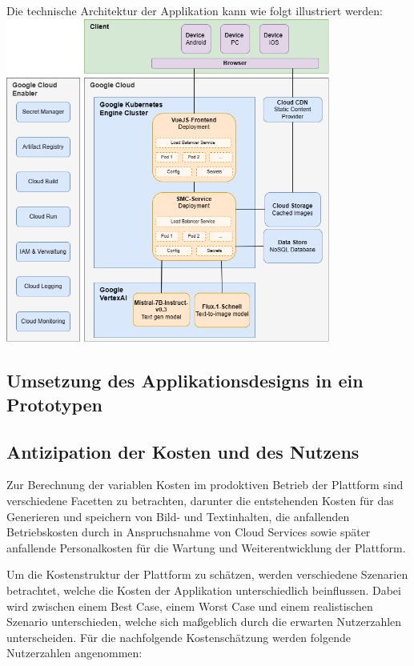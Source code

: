 Die technische Architektur der Applikation kann wie folgt illustriert werden:
\includegraphics[width=0.8\textwidth]{abbildungen/Drawio/SystemArchitektur}

\subsection{Umsetzung des Applikationsdesigns in ein Prototypen}\label{subsec:umsetzung-des-applikationsdesigns-in-ein-prototypen}

\subsection{Antizipation der Kosten und des Nutzens}

Zur Berechnung der variablen Kosten im prodoktiven Betrieb der Plattform sind verschiedene Facetten zu betrachten, darunter die entstehenden Kosten für das Generieren und
speichern von Bild- und Textinhalten, die anfallenden Betriebskosten durch in Anspruchsnahme von Cloud Services sowie später anfallende Personalkosten für die Wartung und Weiterentwicklung der Plattform.

Um die Kostenstruktur der Plattform zu schätzen, werden verschiedene Szenarien betrachtet, welche die Kosten der Applikation unterschiedlich beinflussen.
Dabei wird zwischen einem Best Case, einem Worst Case und einem realistischen Szenario unterschieden, welche sich maßgeblich durch die erwarten Nutzerzahlen unterscheiden.
Für die nachfolgende Kostenschätzung werden folgende Nutzerzahlen angenommen:

